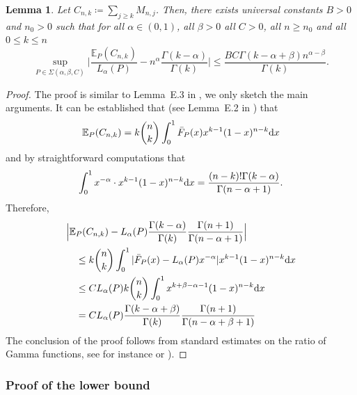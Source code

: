 \documentclass{article}
\newtheorem{lemma}{Lemma}
\newcommand{\1}{\boldsymbol{1}}
\newcommand{\EE}{\mathbb{E}}
\theoremstyle{plain}
\begin{document}
\begin{lemma}
  \label{lem:8}
  Let $C_{n,k} \coloneqq \sum_{j\geq k}M_{n,j}$. Then, there exists universal constants $B > 0$ and $n_0 >0$ such that for all $\alpha \in (0,1)$, all $\beta > 0$ all $C > 0$, all $n \geq n_0$ and all $0 \leq k \leq n$
  \begin{equation*}
    \sup_{P \in \Sigma(\alpha,\beta,C)}\Big| \frac{\EE_P(C_{n,k})}{L_{\alpha}(P)} - n^{\alpha}\frac{\Gamma(k-\alpha)}{\Gamma(k)}  \Big|%
    \leq \frac{BC \Gamma(k-\alpha+\beta) n^{\alpha-\beta}}{\Gamma(k)}.
  \end{equation*}
\end{lemma}
\begin{proof}
  The proof is similar to Lemma~E.3 in \cite{Fav(22)}, we only sketch the main arguments. It can be established that (see Lemma~E.2 in \cite{Fav(22)}) that
  \begin{equation*}
    \EE_P(C_{n,k})%
    = k\binom{n}{k}\int_0^1\bar{F}_P(x)x^{k-1}(1-x)^{n-k}\intd x
  \end{equation*}
  and by straightforward computations that
  \begin{equation*}
    \int_0^1 x^{-\alpha}\cdot x^{k-1}(1-x)^{n-k}\intd x%
    = \frac{(n-k)!\Gamma(k-\alpha)}{\Gamma(n-\alpha+1)}.
  \end{equation*}
  Therefore,
  \begin{align*}
    &\Big|\EE_P(C_{n,k}) - L_{\alpha}(P)\frac{\Gamma(k-\alpha)}{\Gamma(k)}\frac{\Gamma(n+1)}{\Gamma(n-\alpha + 1)} \Big|\\
    &\quad\leq k\binom{n}{k}\int_0^1|\bar{F}_P(x) - L_{\alpha}(P)x^{-\alpha}|x^{k-1}(1-x)^{n-k}\intd x\\
    &\quad\leq CL_{\alpha}(P) k\binom{n}{k}\int_0^1x^{k +\beta - \alpha -1}(1-x)^{n-k}\intd x\\
    &\quad= C L_{\alpha}(P)\frac{\Gamma(k-\alpha+\beta)}{\Gamma(k)}\frac{\Gamma(n+1)}{\Gamma(n-\alpha+\beta+1)}
  \end{align*}
  The conclusion of the proof follows from standard estimates on the ratio of Gamma functions, see for instance \cite[Lemma~E.3]{Fav(22)} or \cite{Tem(96)}).


  
\end{proof}


\subsubsection{Proof of the lower bound}
\label{sec:proof-thm:6}
\end{document}
